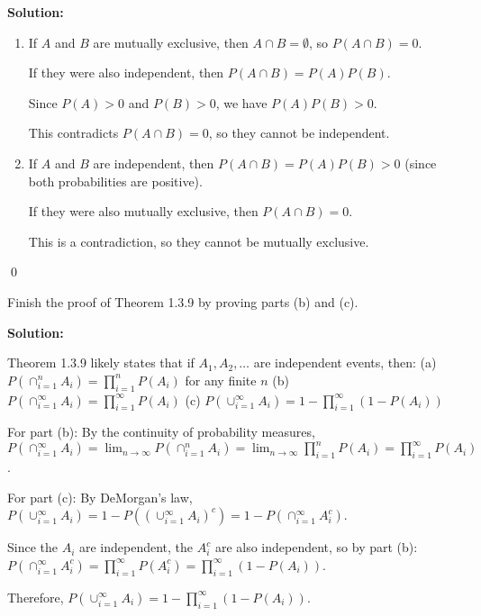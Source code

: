 \noindent\textbf{Solution:}
\begin{enumerate}[label=(\alph*)]
    \item If $A$ and $B$ are mutually exclusive, then $A \cap B = \emptyset$, so $P(A \cap B) = 0$.
    
    If they were also independent, then $P(A \cap B) = P(A)P(B)$.
    
    Since $P(A) > 0$ and $P(B) > 0$, we have $P(A)P(B) > 0$.
    
    This contradicts $P(A \cap B) = 0$, so they cannot be independent.
    
    \item If $A$ and $B$ are independent, then $P(A \cap B) = P(A)P(B) > 0$ (since both probabilities are positive).
    
    If they were also mutually exclusive, then $P(A \cap B) = 0$.
    
    This is a contradiction, so they cannot be mutually exclusive.
\end{enumerate}



\qed
\begin{problembox}
Finish the proof of Theorem 1.3.9 by proving parts (b) and (c).
\end{problembox}

\noindent\textbf{Solution:}

Theorem 1.3.9 likely states that if $A_1, A_2, \ldots$ are independent events, then:
(a) $P(\cap_{i=1}^{n} A_i) = \prod_{i=1}^{n} P(A_i)$ for any finite $n$
(b) $P(\cap_{i=1}^{\infty} A_i) = \prod_{i=1}^{\infty} P(A_i)$
(c) $P(\cup_{i=1}^{\infty} A_i) = 1 - \prod_{i=1}^{\infty} (1 - P(A_i))$

For part (b): By the continuity of probability measures, $P(\cap_{i=1}^{\infty} A_i) = \lim_{n \to \infty} P(\cap_{i=1}^{n} A_i) = \lim_{n \to \infty} \prod_{i=1}^{n} P(A_i) = \prod_{i=1}^{\infty} P(A_i)$.

For part (c): By DeMorgan's law, $P(\cup_{i=1}^{\infty} A_i) = 1 - P((\cup_{i=1}^{\infty} A_i)^c) = 1 - P(\cap_{i=1}^{\infty} A_i^c)$.

Since the $A_i$ are independent, the $A_i^c$ are also independent, so by part (b):
$P(\cap_{i=1}^{\infty} A_i^c) = \prod_{i=1}^{\infty} P(A_i^c) = \prod_{i=1}^{\infty} (1 - P(A_i))$.

Therefore, $P(\cup_{i=1}^{\infty} A_i) = 1 - \prod_{i=1}^{\infty} (1 - P(A_i))$.



